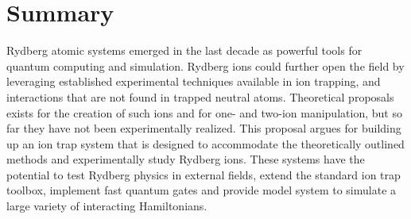 
\section{Summary}

Rydberg atomic systems emerged in the last decade as powerful tools for quantum computing and simulation. Rydberg ions could further open the field by leveraging established experimental techniques available in ion trapping, and interactions that are not found in trapped neutral atoms. Theoretical proposals exists for the creation of such ions and for one- and two-ion manipulation, but so far they have not been experimentally realized. This proposal argues for building up an ion trap system that is designed to accommodate the theoretically outlined methods and experimentally study Rydberg ions. These systems have the potential to test Rydberg physics in external fields, extend the standard ion trap toolbox, implement fast quantum gates and provide model system to simulate a large variety of interacting Hamiltonians.

